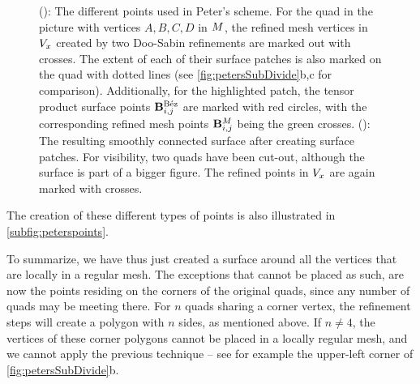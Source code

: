 \begin{figure}
\begin{center}
\begin{subfigure}[b]{.49\textwidth}
\begin{center}
\label{subfig:smoothsurf}
\end{center}
\end{subfigure}
\caption{(): The different points used in Peter's scheme. For the quad in the picture with vertices $A,B,C,D$ in $\petersControlMesh$, the refined mesh vertices in $\petersPatchPoints$ created by two Doo-Sabin refinements are marked out with crosses. The extent of each of their \Bez surface patches is also marked on the quad with dotted lines (see \autoref{fig:petersSubDivide}b,c for comparison). Additionally, for the highlighted patch, the tensor product \Bez surface points $\petersLocalBezPointIndices{i,j}$ are marked with red circles, with the corresponding refined mesh points $\petersLocalPatchPointIndices{i,j}$ being the green crosses. (): The resulting smoothly connected surface after creating \Bez surface patches. For visibility, two quads have been cut-out, although the surface is part of a bigger figure. The refined points in $\petersPatchPoints$ are again marked with crosses.}
\label{fig:petersDiags}
\end{center}
\end{figure}

The creation of these different types of points is also illustrated in \autoref{subfig:peterspoints}. 


%
To summarize, we have thus just created a surface around all the vertices that are locally in a regular mesh. The exceptions that cannot be placed as such, are now the points residing on the corners of the original quads, since any number of quads may be meeting there.
 For $n$ quads sharing a corner vertex, the refinement steps will create a polygon with $n$ sides, as mentioned above. If $n\neq4$, the vertices of these corner polygons cannot be placed in a locally regular mesh, and we cannot apply the previous technique -- see for example the upper-left corner of \autoref{fig:petersSubDivide}b.

